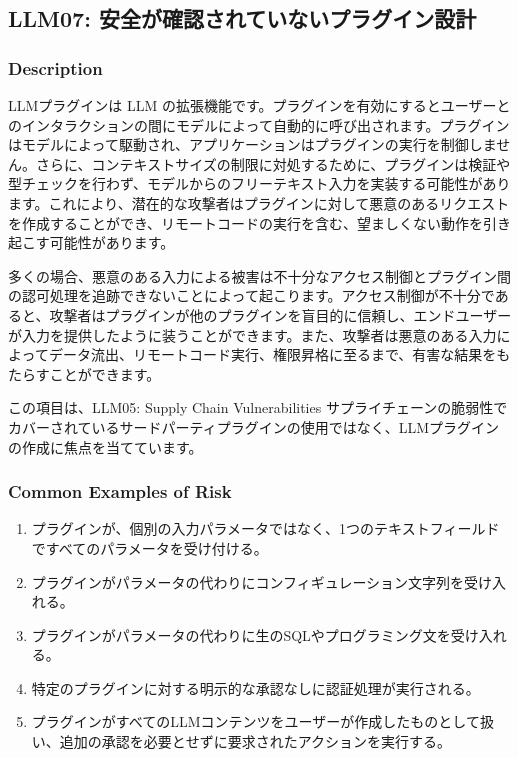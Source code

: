 \documentclass[
]{article}
\author{}
\date{}
\providecommand{\tightlist}{%
  \setlength{\itemsep}{0pt}\setlength{\parskip}{0pt}}
\begin{document}
\subsection{LLM07:
安全が確認されていないプラグイン設計}\label{llm07-ux5b89ux5168ux304cux78baux8a8dux3055ux308cux3066ux3044ux306aux3044ux30d7ux30e9ux30b0ux30a4ux30f3ux8a2dux8a08}

\subsubsection{Description}\label{description}

LLMプラグインは LLM
の拡張機能です。プラグインを有効にするとユーザーとのインタラクションの間にモデルによって自動的に呼び出されます。プラグインはモデルによって駆動され、アプリケーションはプラグインの実行を制御しません。さらに、コンテキストサイズの制限に対処するために、プラグインは検証や型チェックを行わず、モデルからのフリーテキスト入力を実装する可能性があります。これにより、潜在的な攻撃者はプラグインに対して悪意のあるリクエストを作成することができ、リモートコードの実行を含む、望ましくない動作を引き起こす可能性があります。

多くの場合、悪意のある入力による被害は不十分なアクセス制御とプラグイン間の認可処理を追跡できないことによって起こります。アクセス制御が不十分であると、攻撃者はプラグインが他のプラグインを盲目的に信頼し、エンドユーザーが入力を提供したように装うことができます。また、攻撃者は悪意のある入力によってデータ流出、リモートコード実行、権限昇格に至るまで、有害な結果をもたらすことができます。

この項目は、LLM05: Supply Chain Vulnerabilities
サプライチェーンの脆弱性でカバーされているサードパーティプラグインの使用ではなく、LLMプラグインの作成に焦点を当てています。

\subsubsection{Common Examples of Risk}\label{common-examples-of-risk}

\begin{enumerate}
\def\labelenumi{\arabic{enumi}.}
\tightlist
\item
  プラグインが、個別の入力パラメータではなく、1つのテキストフィールドですべてのパラメータを受け付ける。
\item
  プラグインがパラメータの代わりにコンフィギュレーション文字列を受け入れる。
\item
  プラグインがパラメータの代わりに生のSQLやプログラミング文を受け入れる。
\item
  特定のプラグインに対する明示的な承認なしに認証処理が実行される。
\item
  プラグインがすべてのLLMコンテンツをユーザーが作成したものとして扱い、追加の承認を必要とせずに要求されたアクションを実行する。
\end{enumerate}
\end{document}
